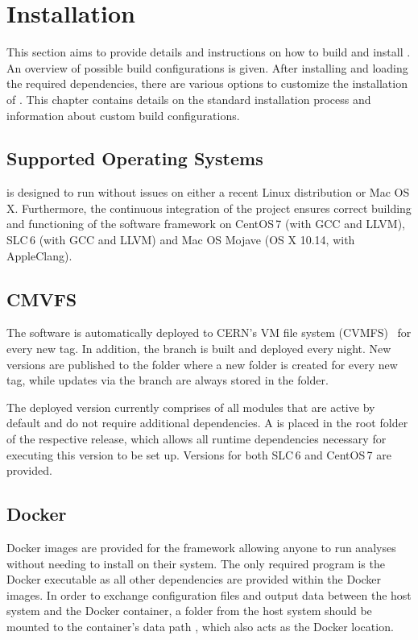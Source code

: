 \chapter{Installation}
\label{ch:installation}

This section aims to provide details and instructions on how to build and install \corry.
An overview of possible build configurations is given.
After installing and loading the required dependencies, there are various options to customize the installation of \corry.
This chapter contains details on the standard installation process and information about custom build configurations.

\section{Supported Operating Systems}
\label{sec:os}
\corry is designed to run without issues on either a recent Linux distribution or Mac OS\,X.
Furthermore, the continuous integration of the project ensures correct building and functioning of the software framework on CentOS\,7 (with GCC and LLVM), SLC\,6 (with GCC and LLVM) and Mac OS Mojave (OS X 10.14, with AppleClang).

\section{CMVFS}
\label{sec:cvmfs_install}
The software is automatically deployed to CERN's VM file system (CVMFS)~\cite{cvmfs} for every new tag.
In addition, the  branch is built and deployed every night.
New versions are published to the folder  where a new folder is created for every new tag, while updates via the  branch are always stored in the  folder.

The deployed version currently comprises of all modules that are active by default and do not require additional dependencies.
A  is placed in the root folder of the respective release, which allows all runtime dependencies necessary for executing this version to be set up.
Versions for both SLC\,6 and CentOS\,7 are provided.

\section{Docker}
\label{sec:docker}
Docker images are provided for the framework allowing anyone to run analyses without needing to install \corry on their system.
The only required program is the Docker executable as all other dependencies are provided within the Docker images.
In order to exchange configuration files and output data between the host system and the Docker container, a folder from the host system should be mounted to the container's data path , which also acts as the Docker  location.

